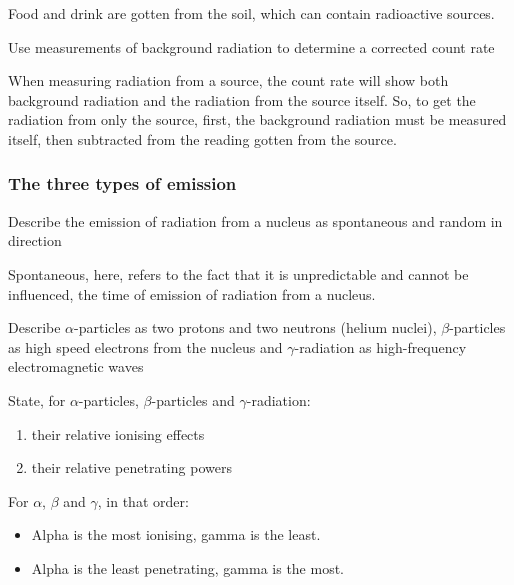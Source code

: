 Food and drink are gotten from the soil, which can contain radioactive sources.

\begin{subpoint}
Use measurements of background radiation to determine a corrected count rate
\end{subpoint}

When measuring radiation from a source, the count rate will show both background
radiation and the radiation from the source itself. So, to get the radiation from 
only the source, first, the background radiation must be measured itself, then
subtracted from the reading gotten from the source.

\subsubsection{The three types of emission}
\begin{subpoint}
Describe the emission of radiation from a nucleus as spontaneous and random in direction
\end{subpoint}

Spontaneous, here, refers to the fact that it is unpredictable and cannot be influenced,
the time of emission of radiation from a nucleus.

\begin{subpoint}
Describe $\alpha$-particles as two protons and two neutrons (helium nuclei), 
$\beta$-particles as high speed electrons from the nucleus and $\gamma$-radiation as
high-frequency electromagnetic waves
\end{subpoint}

\begin{subpoint}
State, for $\alpha$-particles, $\beta$-particles and $\gamma$-radiation:
\begin{enumerate}[label=(\alph*)]
	\setlength\itemsep{0em}
	\item their relative ionising effects
	\item their relative penetrating powers
\end{enumerate}
\end{subpoint}

For $\alpha$, $\beta$ and $\gamma$, in that order:
\begin{itemize}
	\item Alpha is the most ionising, gamma is the least.
	\item Alpha is the least penetrating, gamma is the most.
\end{itemize}

